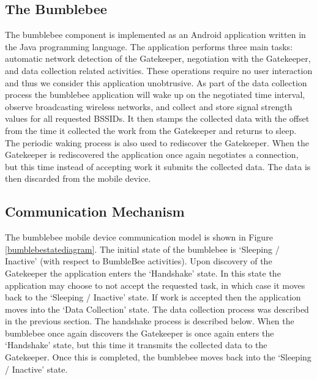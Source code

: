 \subsection{The Bumblebee}
%

The bumblebee component is implemented as an Android application written in the Java programming language. The application performs three main tasks: automatic network detection of the Gatekeeper, negotiation with the Gatekeeper, and data collection related activities. These operations require no user interaction and thus we consider this application unobtrusive. As part of the data collection process the bumblebee application will wake up on the negotiated time interval, observe broadcasting wireless networks, and collect and store signal strength values for all requested BSSIDs. It then stamps the collected data with the offset from the time it collected the work from the Gatekeeper and returns to sleep. The periodic waking process is also used to rediscover the Gatekeeper. When the Gatekeeper is rediscovered the application once again negotiates a connection, but this time instead of accepting work it submits the collected data. The data is then discarded from the mobile device.


\subsection{Communication Mechanism}
%


The bumblebee mobile device communication model is shown in Figure \ref{bumblebestatediagram}. The initial state of the bumblebee is ‘Sleeping / Inactive’ (with respect to BumbleBee activities). Upon discovery of the Gatekeeper the application enters the ‘Handshake’ state. In this state the application may choose to not accept the requested task, in which case it moves back to the ‘Sleeping / Inactive’ state. If work is accepted then the application moves into the ‘Data Collection’ state. The data collection process was described in the previous section. The handshake process is described below. When the bumblebee once again discovers the Gatekeeper is once again enters the ‘Handshake’ state, but this time it transmits the collected data to the Gatekeeper. Once this is completed, the bumblebee moves back into the ‘Sleeping / Inactive’ state.

